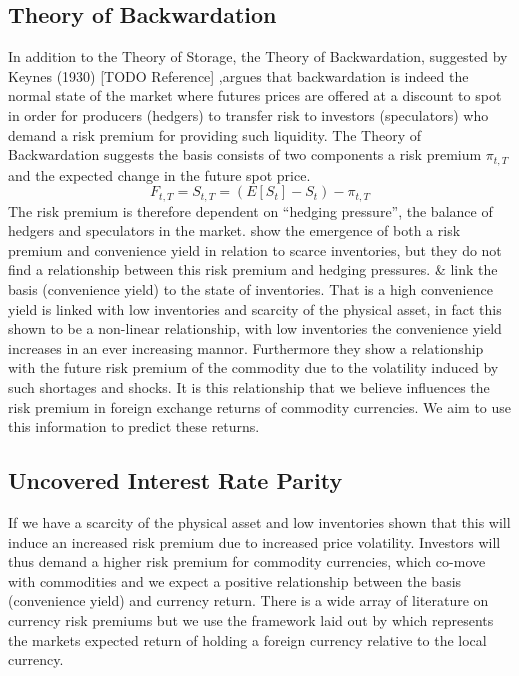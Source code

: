 \subsection{Theory of Backwardation}
In addition to the Theory of Storage, the Theory of Backwardation, suggested by Keynes (1930) [TODO Reference] ,argues that backwardation is indeed the normal state of the market where futures prices are offered at a discount to spot in order for producers (hedgers) to transfer risk to investors (speculators) who demand a risk premium for providing such liquidity. The Theory of Backwardation suggests the basis consists of two components a risk premium $\pi_{t,T}$ and the expected change in the future spot price.
\begin{equation}
 F_{t, T} = S_{t, T} = (E[S_t] - S_t) - \pi_{t,T}
\end{equation}
The risk premium is therefore dependent on ``hedging pressure'', the balance of hedgers and speculators in the market. \cite{gorton2007} show the emergence of both a risk premium and convenience yield in relation to scarce inventories, but they do not find a relationship between this risk premium and hedging pressures. \cite{gorton2007} \& \cite{gorton2013} link the basis (convenience yield) to the state of inventories. That is a high convenience yield is linked with low inventories and scarcity of the physical asset, in fact this shown to be a non-linear relationship, with low inventories the convenience yield increases in an ever increasing mannor. Furthermore they show a relationship with the future risk premium of the commodity due to the volatility induced by such shortages and shocks. It is this relationship that we believe influences the risk premium in foreign exchange returns of commodity currencies. We aim to use this information to predict these returns.

\subsection{Uncovered Interest Rate Parity}
If we have a scarcity of the physical asset and low inventories \cite{gorton2007} shown that this will induce an increased risk premium due to increased price volatility. Investors will thus demand a higher risk premium for commodity currencies, which co-move with commodities and we expect a positive relationship between the basis (convenience yield) and currency return. 
There is a wide array of literature on currency risk premiums but we use the framework laid out by \cite{currencyriskpremium} which represents the markets expected return of holding a foreign currency relative to the local currency. 

